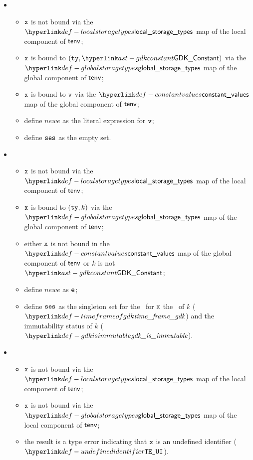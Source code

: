 \begin{itemize}
\begin{itemize}
    \item {}
    \begin{itemize}
    \item $\texttt{x}$ is not bound via the $\localstoragetypes$ map of the local component of $\textsf{tenv}$;
    \item $\texttt{x}$ is bound to $(\tty, \GDKConstant)$ via the $\globalstoragetypes$ map of the global component of $\textsf{tenv}$;
    \item $\texttt{x}$ is bound to $\texttt{v}$ via the $\constantvalues$ map of the global component of $\textsf{tenv}$;
    \item define $newe$ as the literal expression for $\texttt{v}$;
    \item define $\texttt{ses}$ as the empty set.
    \end{itemize}

    \item {}
    \begin{itemize}
      \item $\texttt{x}$ is not bound via the $\localstoragetypes$ map of the local component of $\textsf{tenv}$;
      \item $\texttt{x}$ is bound to $(\texttt{ty}, k)$ via the $\globalstoragetypes$ map of the global component of $\textsf{tenv}$;
      \item either $\texttt{x}$ is not bound in the $\constantvalues$ map of the global component of $\textsf{tenv}$ or $k$ is not $\GDKConstant$;
      \item define $newe$ as $\texttt{e}$;
      \item define $\texttt{ses}$ as the singleton set for the \ReadGlobalTerm\ for $\texttt{x}$ the \timeframeterm\ of
            $k$ ($\timeframeofgdk$) and the immutability status of $k$ ($\gdkisimmutable$).
    \end{itemize}

    \item {}
    \begin{itemize}
      \item $\texttt{x}$ is not bound via the $\localstoragetypes$ map of the local component of $\textsf{tenv}$;
      \item $\texttt{x}$ is not bound via the $\globalstoragetypes$ map of the local component of $\textsf{tenv}$;
      \item the result is a type error indicating that $\texttt{x}$ is an undefined identifier ($\UndefinedIdentifier$).
    \end{itemize}
  \end{itemize}
\end{itemize}

